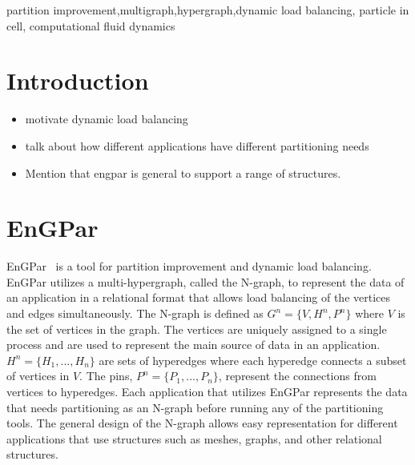 \documentclass[conference]{IEEEtran}
\begin{document}
\begin{IEEEkeywords}
partition improvement,multigraph,hypergraph,dynamic load balancing,
particle in cell, computational fluid dynamics
\end{IEEEkeywords}

\section{Introduction}

\begin{itemize}
\item motivate dynamic load balancing
\item talk about how different applications have different partitioning needs
\item Mention that engpar is general to support a range of structures.
\end{itemize}

\section{EnGPar}


EnGPar~\cite{engparSC17,engpar_github} is a tool for partition improvement and
dynamic load balancing.
EnGPar utilizes a multi-hypergraph, called the N-graph, to represent the data of
an application in a relational format that allows load balancing of the vertices
and edges simultaneously.
The N-graph is defined as $G^n = \{V, H^n, P^n\}$ where
$V$ is the set of vertices in the graph. The vertices are uniquely assigned to a single
process and are used to represent the main source of data in an application.
$H^n = \{H_1, ..., H_n\}$ are sets of hyperedges where each hyperedge connects a
subset of vertices in $V$. The pins, $P^n = \{P_1,...,P_n\}$, represent the connections from
vertices to hyperedges. Each application that utilizes EnGPar represents the data
that needs partitioning as an N-graph before running any of the partitioning tools.
The general design of the N-graph allows easy representation for different applications
that use structures such as meshes, graphs, and other relational structures.
\end{document}
